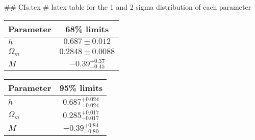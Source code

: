 ## CIs.tex
# latex table for the 1 and 2 sigma distribution of each parameter

\begin{tabular} { l  c}
 Parameter &  68\% limits\\
\hline
{\boldmath$h              $} & $0.687\pm 0.012            $\\
{\boldmath$\Omega_m       $} & $0.2848\pm 0.0088          $\\
{\boldmath$M              $} & $-0.39^{+0.37}_{-0.45}     $\\
\hline
\end{tabular}

\begin{tabular} { l  c}
 Parameter &  95\% limits\\
\hline
{\boldmath$h              $} & $0.687^{+0.024}_{-0.024}   $\\
{\boldmath$\Omega_m       $} & $0.285^{+0.017}_{-0.017}   $\\
{\boldmath$M              $} & $-0.39^{+0.84}_{-0.80}     $\\
\hline
\end{tabular}
